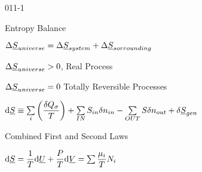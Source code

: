 \begin{mitframe}{011-1}
\begin{listone}
\begin{listtwo}
\begin{listthree}
			\end{listthree} 
   		
        \end{listtwo}
    
    	\item Entropy Balance
    
    	\begin{listtwo}
	
    		\item $\iipf\uline{\entropy}_{universe}=\iipf\uline{\entropy}_{system}+\iipf\uline{\entropy}_{sorrounding}$
    		  
            \begin{listthree}
	
    			\item $\iipf\uline{\entropy}_{universe}>0$, Real Process
    		    		
    			\item $\iipf\uline{\entropy}_{universe}=0 $ Totally Reversible Processes
    
			\end{listthree}  
    		
            \item$\mathrm{d}\uline{\entropy}\equiv\sum\limits_{\state}\bigg(\dfrac{\blthick\heatflow_{\molecrad}}{\Temp}\bigg)+\sum\limits_{IN}\entropy_{in}\blthick{n}_{in}-\sum\limits_{OUT}\entropy\blthick{n}_{out}+\blthick\uline{\entropy}_{gen}$
        \end{listtwo}
        
        \item Combined First and Second Laws
    
    	\begin{listtwo}
	
    		\item $\mathrm{d}\uline{\entropy}=\dfrac{1}{\Temp}\mathrm{d}\uline{\uvel}+\dfrac{\p}{\Temp}\mathrm{d}\uline{\vol}=\sum\dfrac{\chempot_{\state}}{\Temp}\nummoles_{\state}$
    		  
        \end{listtwo}
    
	\end{listone}

\end{mitframe}